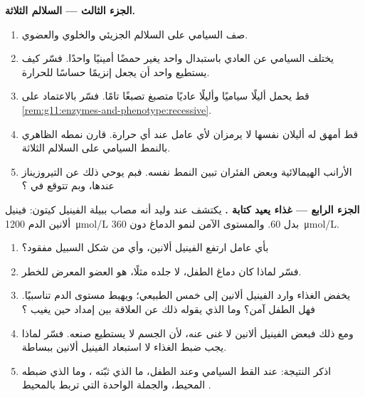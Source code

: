 \begin{problem}
\medskip
\noindent\textbf{الجزء الثالث --- السلالم الثلاثة.}
\begin{enumerate}[resume]
  \item صف  السيامي على السلالم الجزيئي والخلوي والعضوي.
  \item يختلف  السيامي عن العادي باستبدال واحد يغير حمضًا
        أمينيًا واحدًا. فسّر كيف يستطيع  واحد أن يجعل إنزيمًا
        حساسًا للحرارة.
  \item قط يحمل أليلًا سياميًا وأليلًا عاديًا متصبغ تصبغًا تامًا.
        فسّر بالاعتماد على
        \cref{rem:g11:enzymes-and-phenotype:recessive}.
  \item قط أمهق له أليلان  نفسها لا يرمزان لأي  عامل عند
        أي حرارة. قارن نمطه الظاهري بالنمط السيامي على السلالم
        الثلاثة.
  \item الأرانب الهيمالائية وبعض الفئران تبين النمط نفسه. فبم يوحي
        ذلك عن  التيروزيناز عندها، وبم تتوقع في ؟
\end{enumerate}

\medskip
\noindent\textbf{الجزء الرابع --- غذاء يعيد كتابة .}
يكتشف عند وليد أنه مصاب ببيلة الفينيل كيتون: فينيل ألانين الدم
\qty{1200}{\micro mol/L} بدل \num{60}. والمستوى الآمن لنمو الدماغ دون
\qty{360}{\micro mol/L}.
\begin{enumerate}[resume]
  \item بأي عامل ارتفع الفينيل ألانين، وأي  من شكل السبيل مفقود؟
  \item فسّر لماذا كان دماغ الطفل، لا جلده مثلًا، هو العضو المعرض
        للخطر.
  \item يخفض الغذاء وارد الفينيل ألانين إلى خمس الطبيعي؛ ويهبط مستوى
        الدم تناسبيًا. فهل الطفل آمن؟ وما الذي يقوله ذلك عن العلاقة
        بين إمداد   حين يغيب ؟
  \item ومع ذلك فبعض الفينيل ألانين لا غنى عنه، لأن الجسم لا يستطيع
        صنعه. فسّر لماذا يجب ضبط الغذاء لا استبعاد الفينيل ألانين
        ببساطة.
  \item اذكر النتيجة: عند القط السيامي وعند الطفل، ما الذي ثبّته
        ، وما الذي ضبطه المحيط، والجملة الواحدة التي
        تربط  بالمحيط .
\end{enumerate}
\end{problem}
